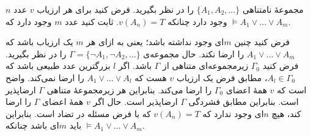 مجموعهٔ نامتناهی
$\{A_1,A_2,\ldots\}$
را در نظر بگیرید. فرض کنید برای هر ارزیاب $v$ عدد $n$ وجود دارد چنانکه $v(A_n)=T$. ثابت کنید عدد $m$ وجود دارد که
$\models A_1\vee\ldots\vee A_m$.
\begin{ans}
  فرض کنید چنین $m$ای وجود نداشته باشد؛ یعنی به ازای هر $m$ یک ارزیاب باشد که\linebreak
  $A_1\vee\ldots\vee A_m$
  را ارضا نکند. حال مجموعه‌ی
  $\Gamma=\{\neg A_1,\neg A_2,\ldots\}$
  را در نظر بگیرید. فرض کنید $\Gamma_0$ زیرمجموعه‌ای متناهی از $\Gamma$ باشد. اگر $l$ بزرگترین عدد طبیعی باشد که $A_l\in\Gamma_0$، مطابق فرض یک ارزیاب $v$ هست که
  $A_1\vee\ldots\vee A_l$
  را ارضا نمی‌کند. واضح است که $v$ همهٔ اعضای $\Gamma_0$ را ارضا می‌کند. بنابراین هر زیرمجموعهٔ متناهی $\Gamma$ ارضاپذیر است. بنابراین مطابق فشردگی $\Gamma$ ارضاپذیر است. حال اگر $v$ همهٔ اعضای $\Gamma$ را ارضا کند، هیچ $n$ای وجود ندارد که $v(A_n)=T$ که با فرض مسئله در تضاد است. بنابراین باید $m$ای باشد چنانکه
  $\models A_1\vee\ldots\vee A_m$.
\end{ans}